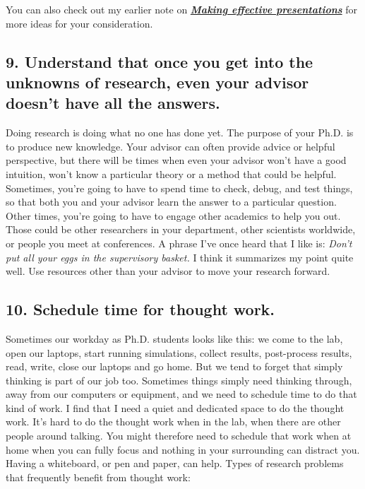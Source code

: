 \documentclass[10pt,twocolumn]{article}
\begin{document}
You can also check out my earlier note on \href{https://kamilazdybal.github.io/jekyll/update/2022/08/07/making-presentations.html}{\textcolor{deepblue}{\textbf{\textit{Making effective presentations}}}} for more ideas for your consideration.

\subsection*{9. Understand that once you get into the unknowns of research, even your advisor doesn’t have all the answers.}

Doing research is doing what no one has done yet. The purpose of your Ph.D. is to produce new knowledge. Your advisor can often provide advice or helpful perspective, but there will be times when even your advisor won’t have a good intuition, won’t know a particular theory or a method that could be helpful. Sometimes, you’re going to have to spend time to check, debug, and test things, so that both you and your advisor learn the answer to a particular question. Other times, you’re going to have to engage other academics to help you out. Those could be other researchers in your department, other scientists worldwide, or people you meet at conferences. A phrase I’ve once heard that I like is: \textit{Don’t put all your eggs in the supervisory basket.} I think it summarizes my point quite well. Use resources other than your advisor to move your research forward.

\subsection*{10. Schedule time for thought work.}

Sometimes our workday as Ph.D. students looks like this: we come to the lab, open our laptops, start running simulations, collect results, post-process results, read, write, close our laptops and go home. But we tend to forget that simply thinking is part of our job too. Sometimes things simply need thinking through, away from our computers or equipment, and we need to schedule time to do that kind of work. I find that I need a quiet and dedicated space to do the thought work. It’s hard to do the thought work when in the lab, when there are other people around talking. You might therefore need to schedule that work when at home when you can fully focus and nothing in your surrounding can distract you. Having a whiteboard, or pen and paper, can help. Types of research problems that frequently benefit from thought work:
\end{document}
